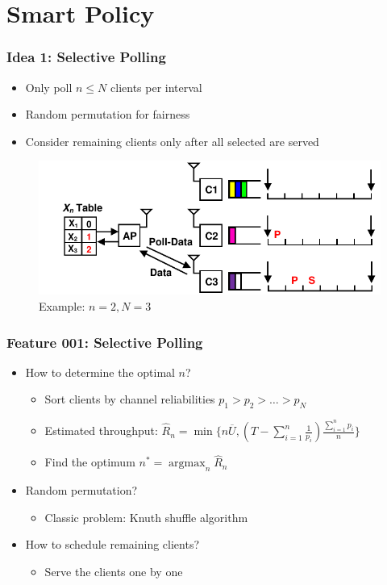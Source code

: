 \documentclass{beamer}
\newcommand{\argmax}{\operatorname{argmax}}
\begin{document}
\section{Smart Policy}

\begin{frame}
\frametitle{Idea 1: Selective Polling}
\begin{itemize}
\item Only poll $n \le N$ clients per interval
\item Random permutation for fairness
\item Consider remaining clients only after all selected are served
\end{itemize}
\begin{figure}
\centering
\includegraphics[scale=0.8]{selective_1.pdf}
\caption{Example: $n=2, N=3$}
\end{figure}
\end{frame}

\begin{frame}
\frametitle{Feature 001: Selective Polling}
\begin{itemize}
\item How to determine the optimal $n$?
  \begin{itemize}
    \item Sort clients by channel reliabilities $p_1 > p_2 > \dots > p_N$
    \item Estimated throughput: $\hat{R}_n = \min\{n\overline{U}, (T-\sum_{i=1}^{n}\frac{1}{p_i})\frac{\sum_{i=1}^{n}p_i}{n} \}$
    \item Find the optimum $n^* = \argmax_{n} \hat{R}_n$
  \end{itemize}
\item Random permutation?
  \begin{itemize}
    \item Classic problem: Knuth shuffle algorithm
  \end{itemize}
\item How to schedule remaining clients?
  \begin{itemize}
    \item Serve the clients one by one
  \end{itemize}
\end{itemize}
\end{frame}
\end{document}
